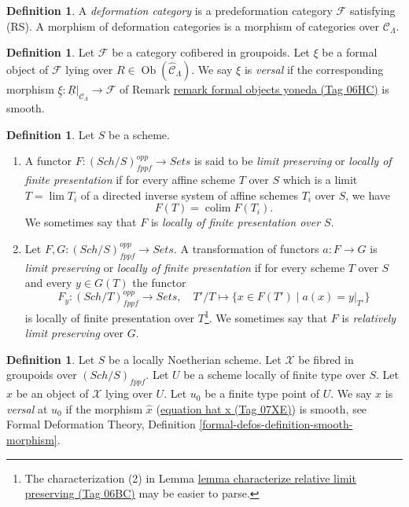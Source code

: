 \documentclass{amsart}
\theoremstyle{plain}
\theoremstyle{definition}
\newtheorem{definition}[subsection]{Definition}
\theoremstyle{remark}
\numberwithin{equation}{subsection}
\def\lim{\mathop{\mathrm{lim}}\nolimits}
\def\colim{\mathop{\mathrm{colim}}\nolimits}
\def\Sch{\mathit{Sch}}
\def\Ob{\mathop{\mathrm{Ob}}\nolimits}
\begin{document}
\begin{definition}
\label{formal-defos-definition-deformation-category}
A {\it deformation category} is a predeformation category $\mathcal{F}$
satisfying (RS). A morphism of deformation categories is a morphism of
categories over $\mathcal{C}_\Lambda$.
\end{definition}

\begin{definition}
\label{formal-defos-definition-versal}
Let $\mathcal{F}$ be a category cofibered in groupoids.  Let $\xi$ be a formal
object of $\mathcal{F}$ lying over $R \in \Ob(\widehat{\mathcal{C}}_\Lambda)$.
We say $\xi$ is {\it versal} if the corresponding morphism
$\underline{\xi}: \underline{R}|_{\mathcal{C}_\Lambda} \to \mathcal{F}$
of Remark \href{https://stacks.math.columbia.edu/tag/06HC}{remark formal objects yoneda (Tag 06HC)} is smooth.
\end{definition}

\begin{definition}
\label{spaces-limits-definition-locally-finite-presentation}
Let $S$ be a scheme.
\begin{enumerate}
\item A functor $F : (\Sch/S)_{fppf}^{opp} \to \textit{Sets}$
is said to be {\it limit preserving} or {\it locally of finite presentation} if
for every affine scheme $T$ over $S$ which is a limit $T = \lim T_i$
of a directed inverse system of affine schemes $T_i$ over $S$, we have
$$
F(T) = \colim F(T_i).
$$
We sometimes say that $F$ is {\it locally of finite presentation over $S$}.
\item Let $F, G : (\Sch/S)_{fppf}^{opp} \to \textit{Sets}$.
A transformation of functors $a : F \to G$
is {\it limit preserving} or {\it locally of finite presentation}
if for every scheme $T$ over $S$ and every $y \in G(T)$ the functor
$$
F_y : (\Sch/T)_{fppf}^{opp} \longrightarrow \textit{Sets}, \quad
T'/T \longmapsto \{x \in F(T') \mid a(x) = y|_{T'}\}
$$
is locally of finite presentation over $T$\footnote{The characterization (2) in
Lemma \href{https://stacks.math.columbia.edu/tag/06BC}{lemma characterize relative limit preserving (Tag 06BC)}
may be easier to parse.}. We sometimes say that
$F$ is {\it relatively limit preserving} over $G$.
\end{enumerate}
\end{definition}

\begin{definition}
\label{definition-versal}
Let $S$ be a locally Noetherian scheme.
Let $\mathcal{X}$ be fibred in groupoids over $(\Sch/S)_{fppf}$.
Let $U$ be a scheme locally of finite type over $S$.
Let $x$ be an object of $\mathcal{X}$ lying over $U$.
Let $u_0$ be a finite type point of $U$.
We say $x$ is {\it versal} at $u_0$ if the morphism $\hat x$
(\href{https://stacks.math.columbia.edu/tag/07XE}{equation hat x (Tag 07XE)}) is smooth, see Formal Deformation Theory, Definition
\ref{formal-defos-definition-smooth-morphism}.
\end{definition}
\end{document}
